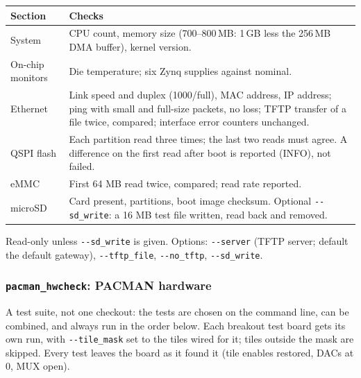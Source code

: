 \documentclass[11pt]{article}
\newcommand{\opt}[1]{\texttt{-{}-#1}}
\begin{document}
\begin{center}
\begin{tabularx}{\linewidth}{@{}lL@{}}
\toprule
Section & Checks \\
\midrule
System & CPU count, memory size (700--800\,MB: 1\,GB less the 256\,MB DMA buffer), kernel version. \\
On-chip monitors & Die temperature; six Zynq supplies against nominal. \\
Ethernet & Link speed and duplex (1000/full), MAC address, IP address; ping with small and full-size packets, no
  loss; TFTP transfer of a file twice, compared; interface error counters unchanged. \\
QSPI flash & Each partition read three times; the last two reads must agree.  A difference on the first read
  after boot is reported (INFO), not failed. \\
eMMC & First 64 MB read twice, compared; read rate reported. \\
microSD & Card present, partitions, boot image checksum.  Optional \opt{sd\_write}: a 16 MB test file written,
  read back and removed. \\
\bottomrule
\end{tabularx}
\end{center}
Read-only unless \opt{sd\_write} is given.  Options: \opt{server} (TFTP server; default the default gateway),
\opt{tftp\_file}, \opt{no\_tftp}, \opt{sd\_write}.

\subsubsection{\texttt{pacman\_hwcheck}: PACMAN hardware}

A test suite, not one checkout:  the tests are chosen on the command line, can be combined, and always run in the
order below.  Each breakout test board gets its own run, with \opt{tile\_mask} set to the tiles wired for it; tiles outside
the mask are skipped.  Every test leaves the board as it found it (tile enables restored, DACs at 0, MUX open).
\end{document}
